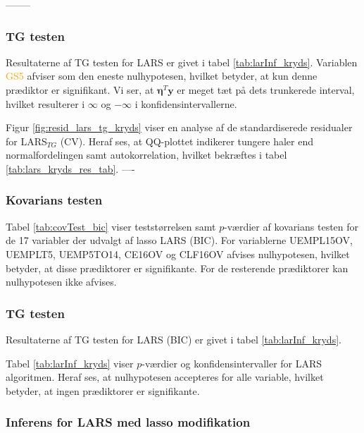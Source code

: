 --------
\subsubsection{TG testen}
Resultaterne af TG testen for LARS er givet i tabel \ref{tab:larInf_kryds}.
Variablen  \textcolor{orange}{GS5} afviser som den eneste nulhypotesen, hvilket betyder, at kun denne prædiktor er signifikant.
Vi ser, at $\boldsymbol{\eta}^T \textbf{y}$ er meget tæt på dets trunkerede interval, hvilket resulterer i $\infty$ og $-\infty$ i konfidensintervallerne.  



Figur \ref{fig:resid_lars_tg_kryds} viser en analyse af de standardiserede residualer for LARS$_{TG}$ (CV). 
Heraf ses, at QQ-plottet indikerer tungere haler end normalfordelingen samt autokorrelation, hvilket bekræftes i tabel \ref{tab:lars_kryds_res_tab}. 
----

\subsubsection{Kovarians testen}
Tabel \ref{tab:covTest_bic} viser teststørrelsen samt $p$-værdier af kovarians testen for de 17 variabler der udvalgt af lasso LARS (BIC). 
For variablerne  \textcolor{blue3}{UEMPL15OV}, \textcolor{blue3}{UEMPLT5}, \textcolor{blue3}{UEMP5TO14}, \textcolor{blue3}{CE16OV} og \textcolor{blue3}{CLF16OV} afvises nulhypotesen, hvilket betyder, at disse prædiktorer er signifikante. 
For de resterende prædiktorer kan nulhypotesen ikke afvises. 



\subsubsection{TG testen}
Resultaterne af TG testen for LARS (BIC) er givet i tabel \ref{tab:larInf_kryds}.





Tabel \ref{tab:larInf_kryds} viser \(p\)-værdier og konfidensintervaller for LARS algoritmen. 
Heraf ses, at nulhypotesen accepteres for alle variable, hvilket betyder, at ingen prædiktorer er signifikante.



\subsubsection{Inferens for LARS med lasso modifikation}





